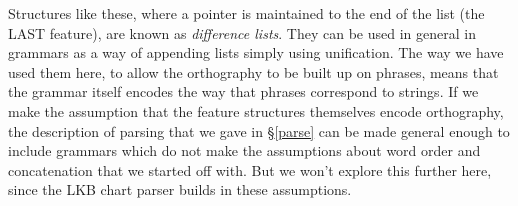 \documentclass[12pt]{report}
\begin{document}
Structures like these, where a pointer is maintained to the end of the
list (the LAST feature), are known as {\it difference lists}.
They can be used in general in grammars as a way of appending lists
simply using unification.
The way we have used them here, to allow the orthography
to be built up on phrases, means that the grammar itself encodes
the way that phrases correspond to strings. 
If we make the assumption that the feature structures themselves
encode orthography, the description of parsing that we gave in
\S\ref{parse} can be made general enough to include grammars
which do not make the assumptions about word order and
concatenation that we started off with.  But we won't explore this
further here, since the LKB chart parser builds in these assumptions.
\end{document}
